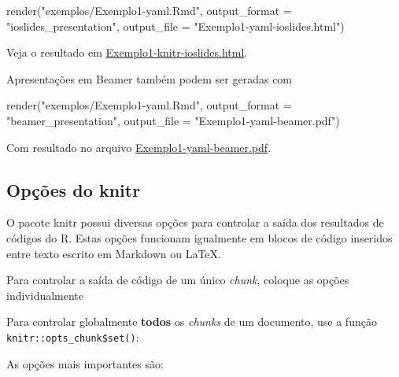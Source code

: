 \documentclass[
  10pt,
  a4paper]{book}
\newenvironment{Shaded}{\begin{snugshade}}{\end{snugshade}}
\newcommand{\AttributeTok}[1]{\textcolor[rgb]{0.77,0.63,0.00}{#1}}
\newcommand{\FunctionTok}[1]{\textcolor[rgb]{0.00,0.00,0.00}{#1}}
\newcommand{\NormalTok}[1]{#1}
\newcommand{\StringTok}[1]{\textcolor[rgb]{0.31,0.60,0.02}{#1}}
\begin{document}
\begin{Shaded}
\begin{Highlighting}[]
\FunctionTok{render}\NormalTok{(}\StringTok{"exemplos/Exemplo1{-}yaml.Rmd"}\NormalTok{,}
       \AttributeTok{output\_format =} \StringTok{"ioslides\_presentation"}\NormalTok{,}
       \AttributeTok{output\_file =} \StringTok{"Exemplo1{-}yaml{-}ioslides.html"}\NormalTok{)}
\end{Highlighting}
\end{Shaded}

Veja o resultado em
\href{exemplos/Exemplo1-knitr-ioslides.html}{Exemplo1-knitr-ioslides.html}.

Apresentações em Beamer também podem ser geradas com

\begin{Shaded}
\begin{Highlighting}[]
\FunctionTok{render}\NormalTok{(}\StringTok{"exemplos/Exemplo1{-}yaml.Rmd"}\NormalTok{,}
       \AttributeTok{output\_format =} \StringTok{"beamer\_presentation"}\NormalTok{,}
       \AttributeTok{output\_file =} \StringTok{"Exemplo1{-}yaml{-}beamer.pdf"}\NormalTok{)}
\end{Highlighting}
\end{Shaded}

Com resultado no arquivo
\href{exemplos/Exemplo1-yaml-beamer.pdf}{Exemplo1-yaml-beamer.pdf}.

\hypertarget{opuxe7uxf5es-do-knitr}{%
\subsection{Opções do knitr}\label{opuxe7uxf5es-do-knitr}}

O pacote knitr possui diversas opções para controlar a saída dos
resultados de códigos do R. Estas opções funcionam igualmente em blocos
de código inseridos entre texto escrito em Markdown ou LaTeX.

Para controlar a saída de código de um único \emph{chunk}, coloque as opções
individualmente

Para controlar globalmente \textbf{todos} os \emph{chunks} de um documento, use a
função \texttt{knitr::opts\_chunk\$set()}:

As opções mais importantes são:
\end{document}

